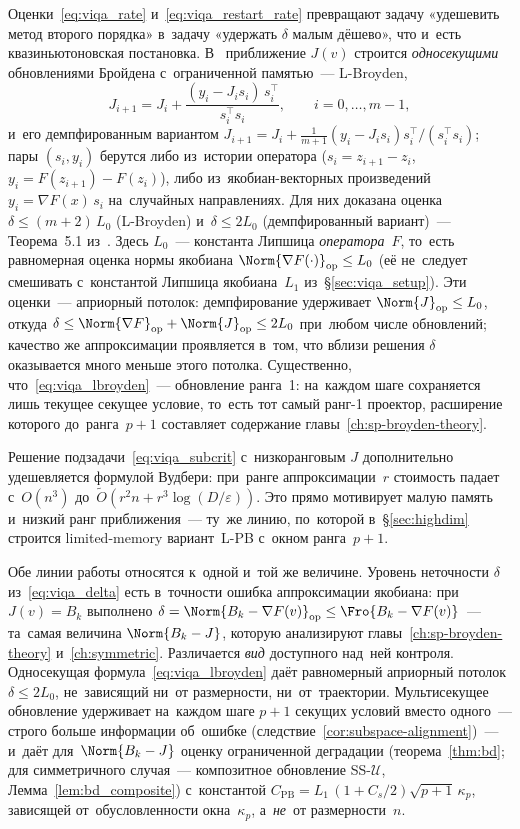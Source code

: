 Оценки~\eqref{eq:viqa_rate} и~\eqref{eq:viqa_restart_rate} превращают
задачу «удешевить метод второго порядка» в~задачу «удержать $\delta$ малым
дёшево», что и~есть квазиньютоновская постановка. В~\cite{viqa2024}
приближение $J(v)$ строится \emph{односекущими} обновлениями Бройдена
с~ограниченной памятью~--- L-Broyden,
\begin{equation}\label{eq:viqa_lbroyden}
  J_{i+1} = J_i + \frac{(y_i - J_i s_i)\,s_i^\top}{s_i^\top s_i},
  \qquad i = 0,\dots,m-1,
\end{equation}
и~его демпфированным вариантом
$J_{i+1}=J_i+\tfrac{1}{m+1}(y_i-J_is_i)s_i^\top/(s_i^\top s_i)$; пары
$(s_i,y_i)$ берутся либо из~истории оператора ($s_i=z_{i+1}-z_i$,
$y_i=F(z_{i+1})-F(z_i)$), либо из~якобиан-векторных произведений
$y_i=\nabla F(x)\,s_i$ на~случайных направлениях. Для них доказана оценка
$\delta\le(m{+}2)\,L_0$ (L-Broyden) и~$\delta\le 2L_0$ (демпфированный
вариант)~--- Теорема~5.1 из~\cite{viqa2024}. Здесь $L_0$~--- константа
Липшица \emph{оператора}~$F$, то~есть равномерная оценка нормы якобиана
$\Norm{\nabla F(\cdot)}_{\mathrm{op}}\le L_0$ (её не~следует смешивать
с~константой Липшица якобиана~$L_1$ из~\S\ref{sec:viqa_setup}). Эти
оценки~--- априорный потолок: демпфирование удерживает
$\Norm{J}_{\mathrm{op}}\le L_0$, откуда
$\delta\le\Norm{\nabla F}_{\mathrm{op}}+\Norm{J}_{\mathrm{op}}\le 2L_0$
при~любом числе обновлений; качество же аппроксимации проявляется в~том,
что вблизи решения $\delta$ оказывается много меньше этого потолка.
Существенно, что~\eqref{eq:viqa_lbroyden}~--- обновление ранга~1: на~каждом
шаге сохраняется лишь текущее секущее условие, то~есть тот самый ранг-1
проектор, расширение которого до~ранга~$p{+}1$ составляет содержание
главы~\ref{ch:sp-broyden-theory}.

Решение подзадачи~\eqref{eq:viqa_subcrit} с~низкоранговым $J$ дополнительно
удешевляется формулой Вудбери: при~ранге аппроксимации~$r$ стоимость
падает с~$O(n^3)$ до~$\widetilde{O}(r^2 n + r^3\log(D/\varepsilon))$. Это
прямо мотивирует малую память и~низкий ранг приближения~--- ту~же линию,
по~которой в~\S\ref{sec:highdim} строится limited-memory вариант~L-PB
с~окном ранга~$p{+}1$.

Обе линии работы относятся к~одной и~той же величине. Уровень неточности
$\delta$ из~\eqref{eq:viqa_delta} есть в~точности ошибка аппроксимации
якобиана: при~$J(v)=B_k$ выполнено
$\delta=\Norm{B_k-\nabla F(v)}_{\mathrm{op}}\le\Fro{B_k-\nabla F(v)}$~---
та~самая величина $\Norm{B_k-J}$, которую анализируют
главы~\ref{ch:sp-broyden-theory} и~\ref{ch:symmetric}. Различается \emph{вид}
доступного над~ней контроля. Односекущая формула~\eqref{eq:viqa_lbroyden}
даёт равномерный априорный потолок $\delta\le 2L_0$, не~зависящий ни~от
размерности, ни~от~траектории. Мультисекущее обновление удерживает
на~каждом шаге $p{+}1$ секущих условий вместо одного~--- строго больше
информации об~ошибке (следствие~\ref{cor:subspace-alignment})~--- и~даёт
для~$\Norm{B_k-J}$ оценку ограниченной деградации (теорема~\ref{thm:bd}; для
симметричного случая~--- композитное обновление SS-$\mathcal{U}$,
Лемма~\ref{lem:bd_composite}) с~константой
$C_{\mathrm{PB}} = L_1\,(1{+}C_s/2)\sqrt{p+1}\,\kappa_p$, зависящей
от~обусловленности окна~$\kappa_p$, а~\emph{не}~от размерности~$n$.

